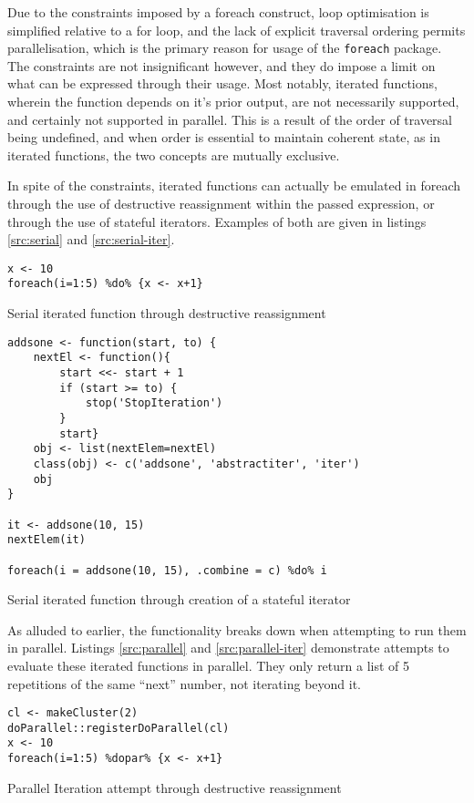 \documentclass[a4paper,10pt]{article}
\begin{document}
Due to the constraints imposed by a foreach construct, loop optimisation is
simplified relative to a for loop, and the lack of explicit traversal ordering
permits parallelisation, which is the primary reason for usage of the
\texttt{foreach} package.
The constraints are not insignificant however, and they do impose a limit on
what can be expressed through their usage.
Most notably, iterated functions, wherein the function depends on it's prior
output, are not necessarily supported, and certainly not supported in parallel.
This is a result of the order of traversal being undefined, and when order is
essential to maintain coherent state, as in iterated functions, the two
concepts are mutually exclusive.

In spite of the constraints, iterated functions can actually be emulated in
foreach through the use of destructive reassignment within the passed
expression, or through the use of stateful iterators.
Examples of both are given in listings \ref{src:serial} and \ref{src:serial-iter}.

\begin{listing}
\begin{verbatim}
x <- 10
foreach(i=1:5) %do% {x <- x+1}
\end{verbatim}
\caption{Serial iterated function through destructive reassignment}\label{src:serial}
\end{listing}

\begin{listing}
\begin{verbatim}
addsone <- function(start, to) {
	nextEl <- function(){
		start <<- start + 1
		if (start >= to) {
			stop('StopIteration')
		}
		start}
	obj <- list(nextElem=nextEl)
	class(obj) <- c('addsone', 'abstractiter', 'iter')
	obj
}

it <- addsone(10, 15)
nextElem(it)

foreach(i = addsone(10, 15), .combine = c) %do% i
\end{verbatim}
\caption{Serial iterated function through creation of a stateful iterator}\label{src:serial-iter}
\end{listing}

As alluded to earlier, the functionality breaks down when attempting to run
them in parallel.
Listings \ref{src:parallel} and \ref{src:parallel-iter} demonstrate attempts to
evaluate these iterated functions in parallel.
They only return a list of 5 repetitions of the same ``next'' number, not
iterating beyond it.

\begin{listing}
\begin{verbatim}
cl <- makeCluster(2)
doParallel::registerDoParallel(cl)
x <- 10
foreach(i=1:5) %dopar% {x <- x+1}
\end{verbatim}
\caption{Parallel Iteration attempt through destructive reassignment}\label{src:parallel}
\end{listing}
\end{document}
